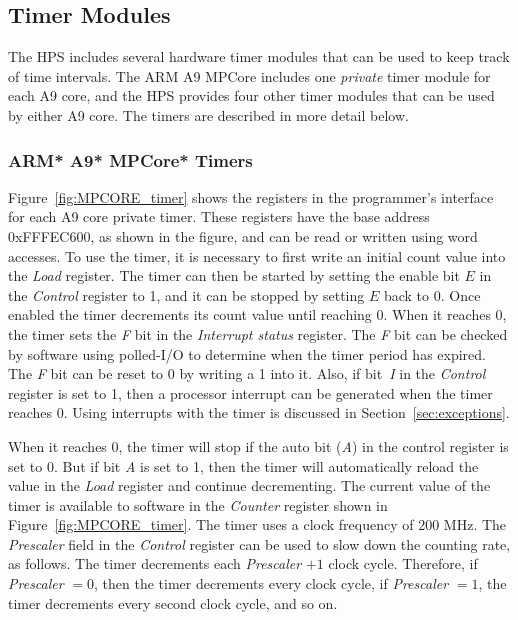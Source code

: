 \subsection{Timer Modules}
\label{sec:timers}
The HPS includes several hardware timer modules that can be used to keep track of time intervals.
The ARM A9 MPCore includes one {\it private} timer module for each A9 core, and the
HPS provides four other timer modules that can be used by either A9 core. The timers are 
described in more detail below.

\subsubsection{ARM* A9* MPCore* Timers}
\label{sec:ARM_timers}
Figure~\ref{fig:MPCORE_timer} shows the registers in the programmer's interface for each
A9 core private timer. These registers have the base address {\sf 0xFFFEC600}, as shown in
the figure, and can be read or written using word accesses. To use the timer, 
it is necessary to first write an
initial count value into the {\it Load} register. The timer can then be started by
setting the enable bit $E$ in the {\it Control} register to 1, and it can be stopped by
setting $E$ back to 0.  Once enabled the timer decrements its count value until reaching 0.
When it reaches 0, the timer sets the {\it F} bit in the {\it Interrupt status} register. 
The {\it F} bit can be checked by software using polled-I/O to determine when the timer
period has expired.  The {\it F} bit can be reset to 0 by writing a 1 into it. 
Also, if bit~{\it I} in the {\it Control} register is set to 1,
then a processor interrupt can be generated when the timer reaches 0.  Using 
interrupts with the timer is discussed in Section~\ref{sec:exceptions}.

When it reaches 0, the timer will stop if the auto bit ({\it A}) in the control register
is set to 0.  But if bit {\it A} is set to 1, then the timer will automatically reload the 
value in the {\it Load} register and continue decrementing. The current value of the timer is
available to software in the {\it Counter} register shown in Figure~\ref{fig:MPCORE_timer}.
The timer uses a clock frequency of 200 MHz. The {\it Prescaler} field in the {\it
Control} register can be used to slow down the counting rate, as follows. The timer decrements 
each {\it Prescaler} $+1$ clock cycle. Therefore, if {\it Prescaler} $=0$, then the
timer decrements every clock cycle, if {\it Prescaler} $=1$, the timer
decrements every second clock cycle, and so on.

